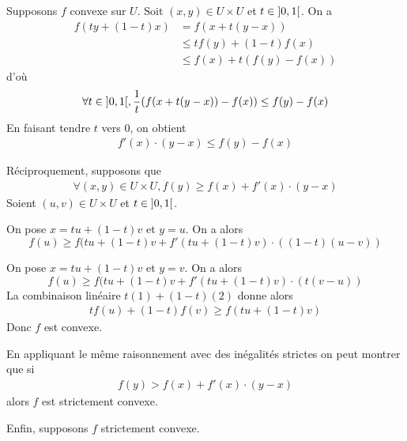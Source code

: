 \documentclass[french,a4paper,10pt]{article}
\begin{document}
	\begin{myproof}
		Supposons $f$ convexe sur $U$. Soit $(x,y)\in U\times U$ et $t\in\mathopen{]}0, 1\mathclose{[}$. On a
			\[\begin{aligned}
				f(ty+(1-t)x)&=f(x+t(y-x))\\
				&\le tf(y)+(1-t)f(x)\\
				&\le f(x)+t(f(y)-f(x))
			\end{aligned}\]
		d'où
			\[\begin{aligned}
				\forall t\in\mathopen{]}0, 1\mathclose{[},\frac1t(f(x+t(y-x))-f(x))\le f(y)-f(x)
			\end{aligned}\]
		En faisant tendre $t$ vers 0, on obtient
			\[\begin{aligned}
				f'(x)\cdot(y-x)\le f(y)-f(x)
			\end{aligned}\]
			
		Réciproquement, supposons que
			\[\begin{aligned}
				\forall (x,y)\in U\times U,f(y)\ge f(x)+f'(x)\cdot(y-x)
			\end{aligned}\]
		Soient $(u,v)\in U\times U$ et $t\in\mathopen{]}0,1\mathclose{[}$.
		
		On pose $x=tu+(1-t)v$ et $y=u$. On a alors
			\[\label{eq1}
			f(u)\ge f(tu+(1-t)v+f'(tu+(1-t)v)\cdot((1-t)(u-v))\tag{1}
			\]
			
		On pose $x=tu+(1-t)v$ et $y=v$. On a alors
			\[\label{eq2}
			f(u)\ge f(tu+(1-t)v+f'(tu+(1-t)v)\cdot(t(v-u))\tag{2}
			\]
		La combinaison linéaire $t\hyperref[eq1]{(1)}+(1-t)\hyperref[eq2]{(2)}$ donne alors 
			\[\begin{aligned}
				tf(u)+(1-t)f(v)\ge f(tu+(1-t)v)
			\end{aligned}\]
		Donc $f$ est convexe.
		
		En appliquant le même raisonnement avec des inégalités strictes on peut montrer que si
			\[\begin{aligned}
				f(y)>f(x)+f'(x)\cdot(y-x)
			\end{aligned}\]
		alors $f$ est strictement convexe.
		
		Enfin, supposons $f$ strictement convexe.
		

\end{myproof}
\end{document}
